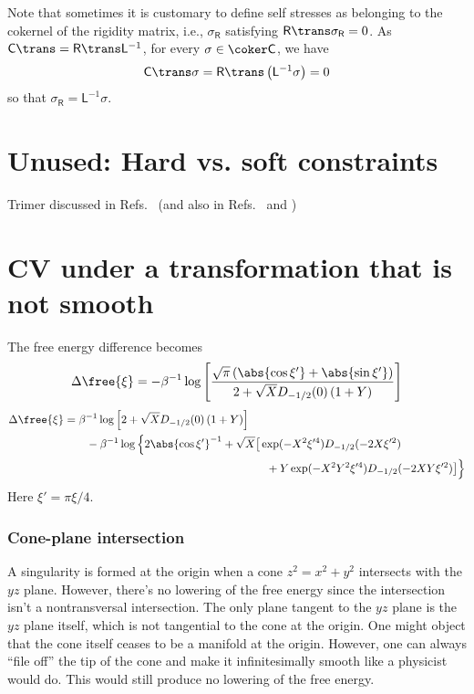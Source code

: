 Note that sometimes it is customary to define self stresses as belonging to the cokernel of the rigidity matrix, i.e., $\sigma_{\mathsf{R}}$ satisfying $\mathsf{R}\trans\sigma_{\mathsf{R}} = 0$.
As $\mathsf{C}\trans = \mathsf{R}\trans\mathsf{L}^{-1}$, for every $\sigma \in \coker\mathsf{C}$, we have
%
\begin{equation}
  \mathsf{C}\trans\sigma = \mathsf{R}\trans\left(\mathsf{L}^{-1}\mathsf{\sigma}\right) = 0
\end{equation}
%
so that $\sigma_{\mathsf{R}} = \mathsf{L}^{-1}\sigma$.




\section{Unused: Hard vs. soft constraints}

Trimer discussed in Refs.~\cite{kampen1981,kampen1984} (and also in Refs.~\cite[Section 15.1]{frenkel2001} and \cite{walter2011})

\section{CV under a transformation that is not smooth}

The free energy difference becomes
%
\begin{equation}
  \Delta\free{\xi} = -\beta^{-1}\log\left[\frac{\sqrt{\pi}\left(\abs{\cos\xi'} + \abs{\sin\xi'}\right)}{2 + \sqrt{X}D_{-1/2}(0)\left(1 + Y\right)}\right]
\end{equation}
\begin{equation}
  \begin{aligned}
    \Delta\free{\xi} &= \beta^{-1}\log\left[2 + \sqrt{X}D_{-1/2}(0)\left(1 + Y\right)\right] \\
                     &\qquad -\beta^{-1}\log\Big\{2\abs{\cos\xi'}^{-1} + \sqrt{X}\big[\exp(-X^{2}\xi'^{4})D_{-1/2}(-2X\xi'^{2})\\
                     & \phantom{\qquad-\beta^{-1}\log\Big\{2\abs{\cos\xi'}^{-1} + \sqrt{X}\big[}
                 \quad+Y\exp(-X^{2}Y^{2}\xi'^{4})D_{-1/2}(-2XY\xi'^{2})\big]\Big\}   \end{aligned}
\end{equation}
%
Here $\xi' = \pi\xi/4$.

\subsubsection*{Cone-plane intersection}

A singularity is formed at the origin when a cone $z^2 = x^2 + y^2$ intersects with the $yz$ plane.
However, there's no lowering of the free energy since the intersection isn't a nontransversal intersection.
The only plane tangent to the $yz$ plane is the $yz$ plane itself, which is not tangential to the cone at the origin.
One might object that the cone itself ceases to be a manifold at the origin.
However, one can always ``file off'' the tip of the cone and make it infinitesimally smooth like a physicist would do.
This would still produce no lowering of the free energy.
